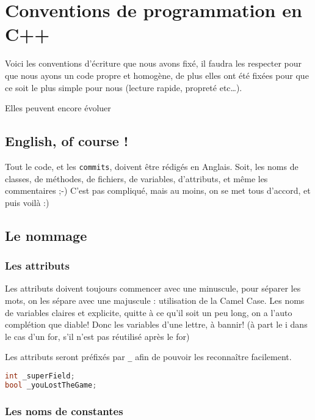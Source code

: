 \chapter{Conventions de programmation en C++}
Voici les conventions d'écriture que nous avons fixé, il faudra les
respecter pour que nous ayons un code propre et homogène, de plus elles
ont été fixées pour que ce soit le plus simple pour nous (lecture rapide,
propreté etc\ldots{}).

\begin{attention}
Elles peuvent encore évoluer
\end{attention}

\section{English, of course !}\label{english-of-course}

Tout le code, et les \texttt{commits}, doivent être rédigés en Anglais. Soit, les
noms de classes, de méthodes, de fichiers, de variables, d'attributs, et
même les commentaires ;-) C'est pas compliqué, mais au moins, on se met
tous d'accord, et puis voilà :)

\section{Le nommage}\label{le-nommage}

\subsection{Les attributs}\label{les-attributs}

Les attributs doivent toujours commencer avec une minuscule, pour
séparer les mots, on les sépare avec une majuscule : utilisation de la
Camel Case. Les noms de variables claires et explicite, quitte à ce
qu'il soit un peu long, on a l'auto complétion que diable! Donc les
variables d'une lettre, à bannir! (à part le i dans le cas d'un for,
s'il n'est pas réutilisé après le for)

Les attributs seront préfixés par \texttt{\_} afin de pouvoir les reconnaître
facilement.

\begin{lstlisting}[language=C++,numbers=none]
int _superField; 
bool _youLostTheGame;
\end{lstlisting}

\subsection{Les noms de constantes}\label{les-noms-de-constantes}

